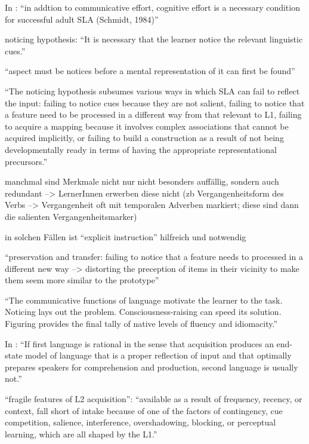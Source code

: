         In \cite{Ellis04}: ``in addtion to communicative effort, cognitive effort is a necessary condition for successful adult SLA (Schmidt, 1984)''

        noticing hypothesis: ``It is necessary that the learner notice the relevant linguistic cues.''

        ``aspect must be notices before a mental representation of it can first be found''

        ``The noticing hypothesis subsumes various ways in which SLA can fail to reflect the input: failing to notice cues because they are not salient, failing to notice that a feature need to be processed in a different way from that relevant to L1, failing to acquire a mapping because it involves complex associations that cannot be acquired implicitly, or failing to build a construction as a result of not being developmentally ready in terms of having the appropriate representational precursors.''

        manchmal sind Merkmale nicht nur nicht besonders auffällig, sondern auch redundant --> LernerInnen erwerben diese nicht (zb Vergangenheitsform des Verbs --> Vergangenheit oft mit temporalen Adverben markiert; diese sind dann die salienten Vergangenheitsmarker)

        in solchen Fällen ist ``explicit instruction'' hilfreich und notwendig

        ``preservation and transfer: failing to notice that a feature needs to processed in a different new way --> distorting the preception of items in their vicinity to make them seem more similar to the prototype''

        ``The communicative functions of language motivate the learner to the task.
        Noticing lays out the problem.
        Consciousness-raising can speed its solution.
        Figuring provides the final tally of native levels of fluency and idiomacity.''

        In \cite{Ellis06}: ``If first language is rational in the sense that acquisition produces an
        end-state model of language that is a proper reflection of input and that
        optimally prepares speakers for comprehension and production, second
        language is usually not.''

        ``fragile features of L2 acquisition'': ``available as a
        result of frequency, recency, or context, fall short of intake because of one of the
        factors of contingency, cue competition, salience, interference, overshadowing,
        blocking, or perceptual learning, which are all shaped by the L1.''

